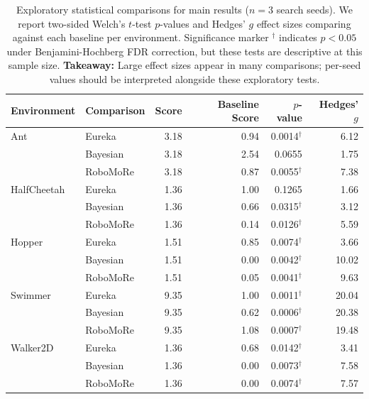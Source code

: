 \begin{table}[htbp]
    \centering
    \small
    \caption{Exploratory statistical comparisons for main results ($n{=}3$ search seeds). We report two-sided Welch's $t$-test $p$-values and Hedges' $g$ effect sizes comparing \abbrev{} against each baseline per environment. Significance marker $^\dagger$ indicates $p < 0.05$ under Benjamini-Hochberg FDR correction, but these tests are descriptive at this sample size. \textbf{Takeaway:} Large effect sizes appear in many comparisons; per-seed values should be interpreted alongside these exploratory tests.}
    \label{tab:statistical_tests}
    \begin{tabular}{llrrrr}
        \toprule
        Environment & Comparison & \abbrev{} Score & Baseline Score & $p$-value & Hedges' $g$ \\
        \midrule
        Ant & Eureka & 3.18 & 0.94 & 0.0014$^\dagger$ & 6.12 \\
         & Bayesian & 3.18 & 2.54 & 0.0655 & 1.75 \\
         & RoboMoRe & 3.18 & 0.87 & 0.0055$^\dagger$ & 7.38 \\
        \midrule
        HalfCheetah & Eureka & 1.36 & 1.00 & 0.1265 & 1.66 \\
         & Bayesian & 1.36 & 0.66 & 0.0315$^\dagger$ & 3.12 \\
         & RoboMoRe & 1.36 & 0.14 & 0.0126$^\dagger$ & 5.59 \\
        \midrule
        Hopper & Eureka & 1.51 & 0.85 & 0.0074$^\dagger$ & 3.66 \\
         & Bayesian & 1.51 & 0.00 & 0.0042$^\dagger$ & 10.02 \\
         & RoboMoRe & 1.51 & 0.05 & 0.0041$^\dagger$ & 9.63 \\
        \midrule
        Swimmer & Eureka & 9.35 & 1.00 & 0.0011$^\dagger$ & 20.04 \\
         & Bayesian & 9.35 & 0.62 & 0.0006$^\dagger$ & 20.38 \\
         & RoboMoRe & 9.35 & 1.08 & 0.0007$^\dagger$ & 19.48 \\
        \midrule
        Walker2D & Eureka & 1.36 & 0.68 & 0.0142$^\dagger$ & 3.41 \\
         & Bayesian & 1.36 & 0.00 & 0.0073$^\dagger$ & 7.58 \\
         & RoboMoRe & 1.36 & 0.00 & 0.0074$^\dagger$ & 7.57 \\
        \bottomrule
    \end{tabular}
\end{table}
